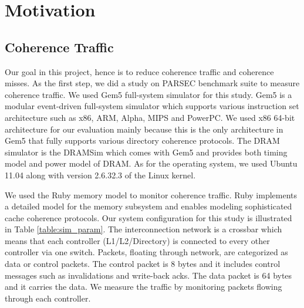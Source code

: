 \section{Motivation}
\label{sec:methodology}

\subsection{Coherence Traffic}

Our goal in this project, hence is to reduce coherence traffic and coherence misses. As the first step, we did a study on PARSEC benchmark suite to measure coherence traffic. We used Gem5 full-system simulator \cite{GEM5} for this study. Gem5 is a modular event-driven full-system simulator which supports various instruction set architecture such as x86, ARM, Alpha, MIPS and PowerPC.
We used x86 64-bit architecture for our evaluation mainly because this is the only architecture in Gem5 that fully supports various directory coherence protocols. The DRAM simulator is the 
DRAMSim which comes with Gem5 and provides both timing model and power model of DRAM.
As for the operating system, we used Ubuntu 11.04 along with version 2.6.32.3 of the Linux kernel.

  We used the Ruby memory model to monitor coherence traffic. Ruby implements a detailed model for the memory subsystem and enables modeling sophisticated cache coherence protocols. Our system configuration for this study is illustrated in Table \ref{table:sim_param}. The interconnection network is a crossbar which means that each controller (L1/L2/Directory) is connected to every other controller via one switch. Packets, floating through network, are categorized as data or control packets. The control packet is 8 bytes and it includes control messages such as invalidations and write-back acks. The data packet is 64 bytes and it carries the data. We measure the traffic by monitoring packets flowing through each controller.\\

